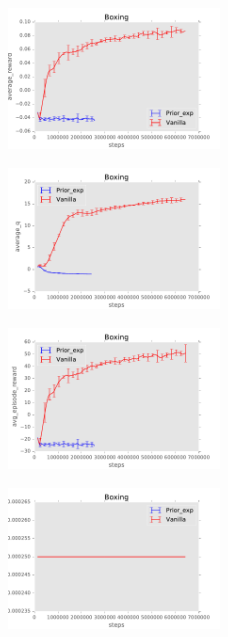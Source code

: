 \documentclass{sig-alternate}
\begin{document}
\begin{figure}
    \centering
    \includegraphics[width=0.5\textwidth]{../results/Boxing/Comparisons/Prior_exp/Prior_exp-baseline-average_reward.pdf}
\end{figure}

\begin{figure}
    \centering
    \includegraphics[width=0.5\textwidth]{../results/Boxing/Comparisons/Prior_exp/Prior_exp-baseline-average_q.pdf}
\end{figure}

\begin{figure}
    \centering
    \includegraphics[width=0.5\textwidth]{../results/Boxing/Comparisons/Prior_exp/Prior_exp-baseline-avg_episode_reward.pdf}
\end{figure}

\begin{figure}
    \centering
    \includegraphics[width=0.5\textwidth]{../results/Boxing/Comparisons/Prior_exp/Prior_exp-baseline-learning_rate.pdf}
\end{figure}
\end{document}
